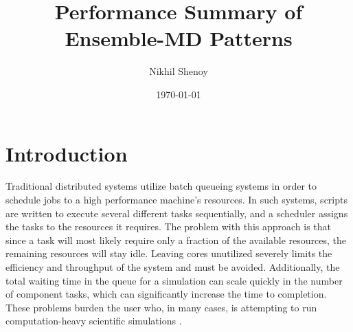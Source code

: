 \documentclass[]{article}
\begin{document}
\title{Performance Summary of Ensemble-MD Patterns}
\author{Nikhil Shenoy}
\date{\today}
\maketitle


\section{Introduction}

	Traditional distributed systems utilize batch queueing systems in order to schedule jobs to a high performance machine's resources. In such systems, scripts are written to execute several different tasks sequentially, and a scheduler assigns the tasks to the resources it requires. The problem with this approach is that since a task will most likely require only a fraction of the available resources, the remaining resources will stay idle. Leaving cores unutilized severely limits the efficiency and throughput of the system and must be avoided. Additionally, the total waiting time in the queue for a simulation can scale quickly in the number of component tasks, which can significantly increase the time to completion. These problems burden the user who, in many cases, is attempting to run computation-heavy scientific simulations \cite{vishal_shah_paper}.
\end{document}
